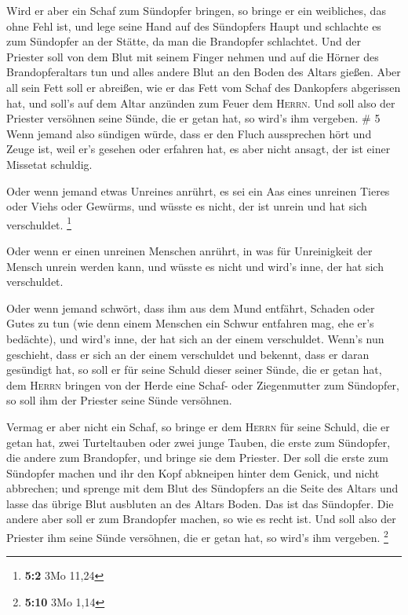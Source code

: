  Wird er aber ein Schaf zum Sündopfer bringen, so bringe
er ein weibliches, das ohne Fehl ist,  und lege seine
Hand auf des Sündopfers Haupt und schlachte es zum Sündopfer an der
Stätte, da man die Brandopfer schlachtet.  Und der
Priester soll von dem Blut mit seinem Finger nehmen und auf die Hörner
des Brandopferaltars tun und alles andere Blut an den Boden des Altars
gießen.  Aber all sein Fett soll er abreißen, wie er das
Fett vom Schaf des Dankopfers abgerissen hat, und soll's auf dem Altar
anzünden zum Feuer dem \textsc{Herrn}. Und soll also der Priester
versöhnen seine Sünde, die er getan hat, so wird's ihm vergeben. \# 5
 Wenn jemand also sündigen würde, dass er den Fluch
aussprechen hört und Zeuge ist, weil er's gesehen oder erfahren hat, es
aber nicht ansagt, der ist einer Missetat schuldig.

 Oder wenn jemand etwas Unreines anrührt, es sei ein Aas
eines unreinen Tieres oder Viehs oder Gewürms, und wüsste es nicht, der
ist unrein und hat sich verschuldet. \footnote{\textbf{5:2} 3Mo 11,24}

 Oder wenn er einen unreinen Menschen anrührt, in was für
Unreinigkeit der Mensch unrein werden kann, und wüsste es nicht und
wird's inne, der hat sich verschuldet.

 Oder wenn jemand schwört, dass ihm aus dem Mund entfährt,
Schaden oder Gutes zu tun (wie denn einem Menschen ein Schwur entfahren
mag, ehe er's bedächte), und wird's inne, der hat sich an der einem
verschuldet.  Wenn's nun geschieht, dass er sich an der
einem verschuldet und bekennt, dass er daran gesündigt hat,
 so soll er für seine Schuld dieser seiner Sünde, die er
getan hat, dem \textsc{Herrn} bringen von der Herde eine Schaf- oder
Ziegenmutter zum Sündopfer, so soll ihm der Priester seine Sünde
versöhnen.

 Vermag er aber nicht ein Schaf, so bringe er dem
\textsc{Herrn} für seine Schuld, die er getan hat, zwei Turteltauben
oder zwei junge Tauben, die erste zum Sündopfer, die andere zum
Brandopfer,  und bringe sie dem Priester. Der soll die
erste zum Sündopfer machen und ihr den Kopf abkneipen hinter dem Genick,
und nicht abbrechen;  und sprenge mit dem Blut des
Sündopfers an die Seite des Altars und lasse das übrige Blut ausbluten
an des Altars Boden. Das ist das Sündopfer.  Die andere
aber soll er zum Brandopfer machen, so wie es recht ist. Und soll also
der Priester ihm seine Sünde versöhnen, die er getan hat, so wird's ihm
vergeben. \footnote{\textbf{5:10} 3Mo 1,14}

